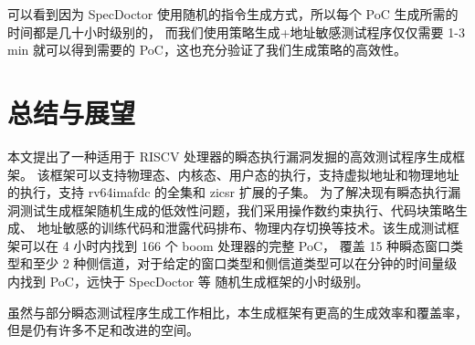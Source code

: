 \begin{table}[h!]
    \begin{center} 
    \caption{与 SpecDoctor 的性能比较} 
    \label{table:cmp-specdoctor}  
    \end{center}
\end{table}

可以看到因为 SpecDoctor 使用随机的指令生成方式，所以每个 PoC 生成所需的时间都是几十小时级别的，
而我们使用策略生成+地址敏感测试程序仅仅需要 1-3 min 就可以得到需要的 PoC，这也充分验证了我们生成策略的高效性。\par

\cleardoublepage
\section{总结与展望}

本文提出了一种适用于 RISCV 处理器的瞬态执行漏洞发掘的高效测试程序生成框架。
该框架可以支持物理态、内核态、用户态的执行，支持虚拟地址和物理地址的执行，支持 rv64imafdc 的全集和 zicsr 扩展的子集。
为了解决现有瞬态执行漏洞测试生成框架随机生成的低效性问题，我们采用操作数约束执行、代码块策略生成、
地址敏感的训练代码和泄露代码排布、物理内存切换等技术。该生成测试框架可以在 4 小时内找到 166 个 boom 处理器的完整 PoC，
覆盖 15 种瞬态窗口类型和至少 2 种侧信道，对于给定的窗口类型和侧信道类型可以在分钟的时间量级内找到 PoC，远快于 SpecDoctor 等
随机生成框架的小时级别。\par

虽然与部分瞬态测试程序生成工作相比，本生成框架有更高的生成效率和覆盖率，但是仍有许多不足和改进的空间。\par

